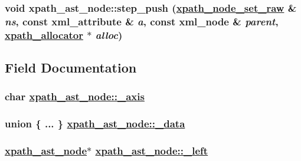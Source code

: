 \hypertarget{classxpath__ast__node_a141bfbd4d5e42da83f0de8f729eb849}{
\subsubsection[step\_\-push]{\setlength{\rightskip}{0pt plus 5cm}void xpath\_\-ast\_\-node::step\_\-push (\hyperlink{classxpath__node__set__raw}{xpath\_\-node\_\-set\_\-raw} \& {\em ns}, const xml\_\-attribute \& {\em a}, const xml\_\-node \& {\em parent}, \hyperlink{classxpath__allocator}{xpath\_\-allocator} $\ast$ {\em alloc})}}
\label{classxpath__ast__node_a141bfbd4d5e42da83f0de8f729eb849}




\subsection{Field Documentation}
\hypertarget{classxpath__ast__node_97b21db6df156c37ef7f2e6f69478b77}{
\subsubsection[\_\-axis]{\setlength{\rightskip}{0pt plus 5cm}char \hyperlink{classxpath__ast__node_97b21db6df156c37ef7f2e6f69478b77}{xpath\_\-ast\_\-node::\_\-axis}}}
\label{classxpath__ast__node_97b21db6df156c37ef7f2e6f69478b77}


\hypertarget{classxpath__ast__node_4a44839b652d66262d384347c529c7c0}{
\subsubsection[\_\-data]{\setlength{\rightskip}{0pt plus 5cm}union \{ ... \}   \hyperlink{classxpath__ast__node_4a44839b652d66262d384347c529c7c0}{xpath\_\-ast\_\-node::\_\-data}}}
\label{classxpath__ast__node_4a44839b652d66262d384347c529c7c0}


\hypertarget{classxpath__ast__node_d229146ced94be21eb5e4921b43a7ebb}{
\subsubsection[\_\-left]{\setlength{\rightskip}{0pt plus 5cm}\hyperlink{classxpath__ast__node}{xpath\_\-ast\_\-node}$\ast$ \hyperlink{classxpath__ast__node_d229146ced94be21eb5e4921b43a7ebb}{xpath\_\-ast\_\-node::\_\-left}}}
\label{classxpath__ast__node_d229146ced94be21eb5e4921b43a7ebb}



